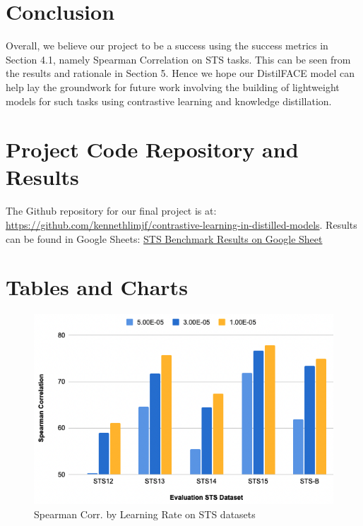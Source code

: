 \documentclass[10pt,twocolumn,letterpaper]{article}
\begin{document}
\section{Conclusion}

Overall, we believe our project to be a success using the success metrics in Section 4.1, namely Spearman Correlation on STS tasks. This can be seen from the results and rationale in Section 5. Hence we hope our DistilFACE model can help lay the groundwork for future work involving the building of lightweight models for such tasks using contrastive learning and knowledge distillation.



\small{


}


\begin{appendices}

\section{Project Code Repository and Results}
The Github repository for our final project is at: \url{https://github.com/kennethlimjf/contrastive-learning-in-distilled-models}.
Results can be found in Google Sheets: \href{https://docs.google.com/spreadsheets/d/1OfyPI4u9lc5NnkdpgvJFfPLUDZ8BTxlnjT0_v__VMdE/edit?usp=sharing}{STS Benchmark Results on Google Sheet}
\section{Tables and Charts}

\begin{figure}[hbt!]
\centering
\includegraphics[scale=0.3]{images/Results-Evaluation-Score-by-Learning-Rate.png}
\caption{Spearman Corr. by Learning Rate on STS datasets}
\label{fig:short}
\end{figure}


\end{appendices}
\end{document}
